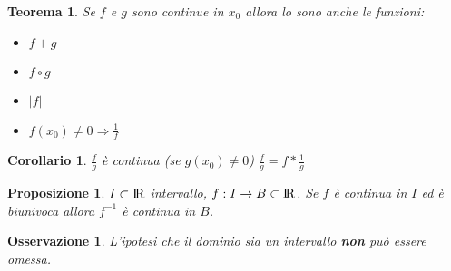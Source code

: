 \documentclass[12pt, a4paper]{article}
\theoremstyle{break}
\newtheorem{theorem}{Teorema}[subsection]
\newtheorem{corollary}{Corollario}[theorem]
\newtheorem{proposition}{Proposizione}[subsection]
\newtheorem{observation}{Osservazione}[subsection]
\newcommand\R{{\rm I\!R}}
\begin{document}
    \begin{theorem}
        Se $f$ e $g$ sono continue in $x_0$ allora lo sono anche le funzioni:
        \begin{itemize}
            \item $f+g$
            \item $f\circ g$
            \item $|f|$
            \item $f(x_0)\neq 0 \Rightarrow \frac{1}{f}$
        \end{itemize}
    \end{theorem}
    \begin{corollary}
        $\frac{f}{g}$ è continua (se $g(x_0)\neq 0$) $\frac{f}{g} = f * \frac{1}{g}$
    \end{corollary}
    \begin{proposition}
        $I\subset\R$ intervallo, $f:I\rightarrow B \subset\R$.\newline
        Se $f$ è continua in $I$ ed è biunivoca allora $f^{-1}$ è continua in $B$.
    \end{proposition}
    \begin{observation}
        L'ipotesi che il dominio sia un intervallo \textbf{non} può essere omessa.
    \end{observation}
\end{document}
